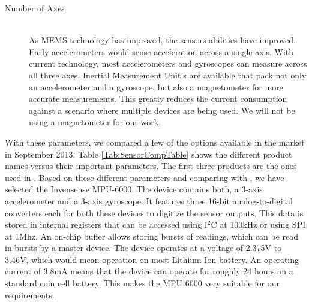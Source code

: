 \begin{description}
\item[Number of Axes] \hfill \\
As MEMS technology has improved, the sensors abilities have improved. Early accelerometers would sense acceleration across a single axis. With current technology, most accelerometers and gyroscopes can measure across all three axes. Inertial Measurement Unit's are available that pack not only an accelerometer and a gyroscope, but also a magnetometer for more accurate measurements. This greatly reduces the current consumption against a scenario where multiple devices are being used. We will not be using a magnetometer for our work.
\end{description}
With these parameters, we compared a few of the options available in the market in September 2013. Table \ref{Tab:SensorCompTable} shows the different product names versus their important parameters. The first three products are the ones used in \cite{drennan2010assessment}.
Based on these different parameters and comparing with \cite{drennan2010assessment}, we have selected the Invensense MPU-6000. The device contains both, a 3-axis accelerometer and a 3-axis gyroscope. It features three 16-bit analog-to-digital converters each for both these devices to digitize the sensor outputs. This data is stored in internal registers that can be accessed using I$^{2}$C at 100kHz or using SPI at 1Mhz. An on-chip buffer allows storing bursts of readings, which can be read in bursts by a master device. The device operates at a voltage of 2.375V to 3.46V, which would mean operation on most Lithium Ion battery. An operating current of 3.8mA means that the device can operate for roughly 24 hours on a standard coin cell battery. This makes the MPU 6000 very suitable for our requirements.

